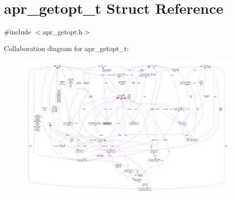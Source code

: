 \hypertarget{structapr__getopt__t}{}\section{apr\+\_\+getopt\+\_\+t Struct Reference}
\label{structapr__getopt__t}


{\ttfamily \#include $<$apr\+\_\+getopt.\+h$>$}



Collaboration diagram for apr\+\_\+getopt\+\_\+t\+:
\nopagebreak
\begin{figure}[H]
\begin{center}
\leavevmode
\includegraphics[width=350pt]{structapr__getopt__t__coll__graph}
\end{center}
\end{figure}
